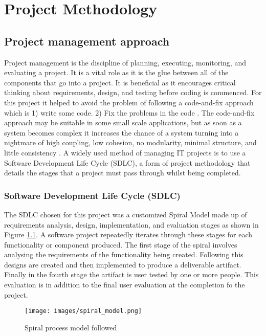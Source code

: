 
\chapter{Project Methodology}\label{C:m}

\section{Project management approach}
Project management is the discipline of planning, executing, monitoring, and
evaluating a project. It is a vital role as it is the glue between all of the
 components that go into a project. It is beneficial as it
encourages critical thinking about requirements, design, and testing before coding is
commenced. For this project it helped to avoid the problem of following a
code-and-fix approach which is 1) write some code. 2) Fix the problems in
the code \cite{boehm1988spiral}. The code-and-fix approach may be suitable in some 
small scale applications, but as soon as a system becomes complex it increases
the chance of a system turning into a nightmare of high coupling, low cohesion,
no modularity, minimal structure, and little consistency \cite{foote1997big}.
A widely used method of managing IT projects is to use a Software Development
Life Cycle (SDLC), a form of project methodology that details the stages that a project must pass through whilst being completed.

\subsection{Software Development Life Cycle (SDLC)}
The SDLC chosen for
this project was a customized Spiral Model \cite{boehm1988spiral} made up of
requirements analysis, design, implementation, and evaluation stages as shown in
Figure \ref{fig:spiralModel}. A software project repeatedly iterates through these stages for each functionality or component produced. The first stage of the spiral involves analysing the
requirements of the functionality being created. Following this designs are created and then implemented to produce a deliverable artifact. Finally in the fourth stage the artifact is user tested by one
or more people. This evaluation is in addition to the final user evaluation at the completion fo the project. 

\begin{figure}[H]
  \centering
      \texttt{[image: images/spiral\_model.png]}
  \caption{Spiral process model followed}
  \label{fig:spiralModel}
\end{figure}

